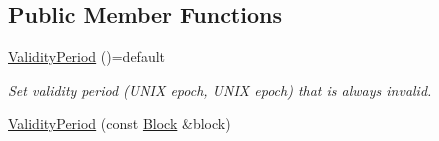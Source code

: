 \subsection*{Public Member Functions}
\begin{DoxyCompactItemize}
\item 
\hyperlink{classndn_1_1security_1_1ValidityPeriod_ac5f431a587ae64573d98fb43de15a1be}{Validity\+Period} ()=default\hypertarget{classndn_1_1security_1_1ValidityPeriod_ac5f431a587ae64573d98fb43de15a1be}{}\label{classndn_1_1security_1_1ValidityPeriod_ac5f431a587ae64573d98fb43de15a1be}

\begin{DoxyCompactList}\small\item\em Set validity period (U\+N\+IX epoch, U\+N\+IX epoch) that is always invalid. \end{DoxyCompactList}\item 
\hyperlink{classndn_1_1security_1_1ValidityPeriod_a32bfd4f2eb8a9cd46ebe8c3f9db33c4b}{Validity\+Period} (const \hyperlink{classndn_1_1Block}{Block} \&block)\hypertarget{classndn_1_1security_1_1ValidityPeriod_a32bfd4f2eb8a9cd46ebe8c3f9db33c4b}{}\label{classndn_1_1security_1_1ValidityPeriod_a32bfd4f2eb8a9cd46ebe8c3f9db33c4b}


\end{DoxyCompactItemize}
